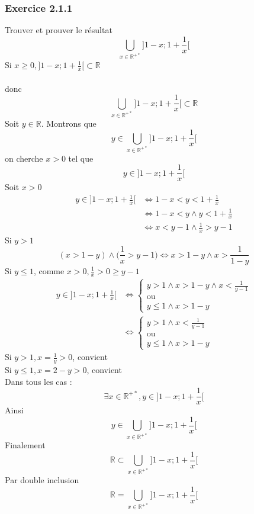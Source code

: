 \documentclass[a4paper,12pt]{article}
\begin{document}
\subsubsection{Exercice 2.1.1}
Trouver et prouver le résultat
\[
\bigcup_{x \in \mathbb{R}^{+*}} \Big] 1-x ; 1 + \frac{1}{x} \Big[
\]
Si $x \ge 0, \Big] 1 - x ; 1 + \frac{1}{x}\Big[ \subset \mathbb{R}$\\\\
donc 
\[
\bigcup_{x \in \mathbb{R}^{+*}} \Big] 1-x ; 1 + \frac{1}{x} \Big[ \subset \mathbb{R}
\]
Soit $y \in \mathbb{R}$. Montrons que 
\[
y \in \bigcup_{x \in \mathbb{R}^{+*}} \Big] 1-x ; 1 + \frac{1}{x} \Big[
\]
on cherche $x > 0$ tel que
\[
y \in \Big] 1 - x ; 1 + \frac{1}{x}\Big[ 
\]
Soit $x > 0$
\[
\begin{aligned}
y \in \Big] 1 - x ; 1 + \frac{1}{x}\Big[ &\Leftrightarrow 1-x < y  < 1+ \frac{1}{x}\\
& \Leftrightarrow 1 - x < y \wedge y < 1 + \frac{1}{x}\\
& \Leftrightarrow x < y - 1 \wedge \frac{1}{x} > y - 1
\end{aligned}
\]
Si $y > 1$
\[
(x > 1 - y) \wedge \Big(\frac{1}{x} > y - 1\Big) \Leftrightarrow x > 1-y \wedge x > \frac{1}{1-y}
\]
Si $y \le 1$, comme $x > 0, \frac{1}{x} > 0 \ge y - 1$
\[
\begin{aligned}
y \in \Big] 1 - x ; 1 + \frac{1}{x}\Big[& \Leftrightarrow 
\begin{cases}
y > 1 \wedge x > 1 - y \wedge x < \frac{1}{y-1}\\
\text{ou}\\
y \le 1 \wedge x > 1 - y
\end{cases}
\\
&\Leftrightarrow 
\begin{cases}
y > 1 \wedge x < \frac{1}{y-1}\\
\text{ou}\\
y \le 1 \wedge x > 1 - y
\end{cases}
\end{aligned}
\]
Si $ y > 1, x = \frac{1}{y} > 0$, convient\\
Si $ y \le 1, x = 2 - y > 0$, convient\\
Dans tous les cas :
\[
\exists x \in \mathbb{R}^{+*}, y \in \Big] 1 - x ; 1 + \frac{1}{x} \Big[
\]
Ainsi
\[
y \in \bigcup_{x \in \mathbb{R}^{+*}} \Big] 1-x ; 1 + \frac{1}{x} \Big[
\]
Finalement
\[
\mathbb{R} \subset \bigcup_{x \in \mathbb{R}^{+*}} \Big] 1-x ; 1 + \frac{1}{x} \Big[ 
\]
Par double inclusion 
\[
\mathbb{R} = \bigcup_{x \in \mathbb{R}^{+*}} \Big] 1-x ; 1 + \frac{1}{x} \Big[ 
\]
\end{document}
